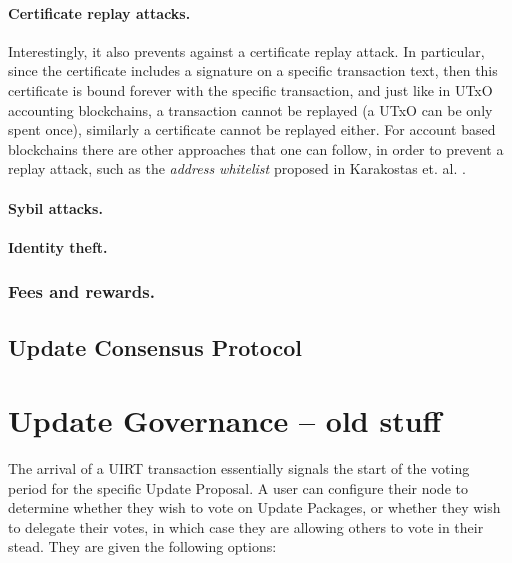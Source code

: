 \paragraph{Certificate replay attacks.}
Interestingly, it also prevents against a certificate replay attack. In particular, since the certificate includes a signature on a specific transaction text, then this certificate is bound forever with the specific transaction, and just like in UTxO accounting blockchains, a transaction cannot be replayed (a UTxO can be only spent once), similarly a certificate cannot be replayed either. For account based blockchains there are other approaches that one can follow, in order to prevent a replay attack, such as the \emph{address whitelist} proposed in Karakostas et. al. \cite{stakepools}.

\paragraph{Sybil attacks.}

\paragraph{Identity theft.}

\subsubsection*{Fees and rewards.}

\subsection{Update Consensus Protocol}


\section*{Update Governance -- old stuff}
The arrival of a UIRT transaction essentially signals the start of the voting period for the specific Update Proposal. A user can configure their node to determine whether they wish to vote on Update Packages, or whether they wish to delegate their votes, in which case they are allowing others to vote in their stead. They are given the following options:

